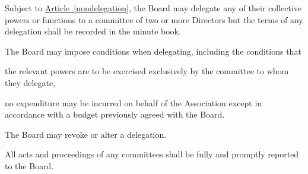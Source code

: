 \documentclass[12pt]{article}
\newcommand{\EC}[0]{Board}
\newcommand{\Exec}[0]{\EC{} }
\newcommand{\articleref}[1]{\hyperref[#1]{Article~\ref*{#1}}}
\begin{document}
\begin{constenum}

\item Subject to \articleref{nondelegation}, the \Exec may delegate
  any of their collective powers or functions to a committee of two or
  more Directors but the terms of any delegation shall be
  recorded in the minute book.

\item The \Exec may impose conditions when delegating, including
  the conditions that

\begin{constenum}

\item the relevant powers are to be exercised exclusively by the
  committee to whom they delegate,

\item no expenditure may be incurred on behalf of the Association except
  in accordance with a budget previously agreed with the \EC.

\end{constenum}

\item The \Exec may revoke or alter a delegation.

\item All acts and proceedings of any committees shall be fully and
  promptly reported to the \EC.

\end{constenum}

\end{document}
